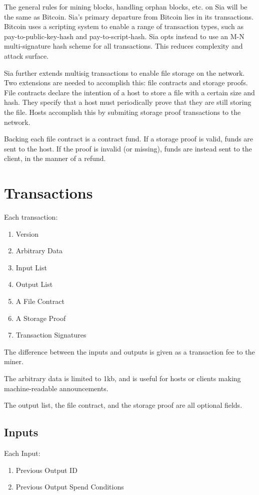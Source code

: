 \documentclass[twocolumn]{article}
\begin{document}
The general rules for mining blocks, handling orphan blocks, etc. on Sia will be the same as Bitcoin.
Sia's primary departure from Bitcoin lies in its transactions.
Bitcoin uses a scripting system to enable a range of transaction types, such as pay-to-public-key-hash and pay-to-script-hash.
Sia opts instead to use an M-N multi-signature hash scheme for all transactions.
This reduces complexity and attack surface.

Sia further extends multisig transactions to enable file storage on the network.
Two extensions are needed to accomplish this: file contracts and storage proofs.
File contracts declare the intention of a host to store a file with a certain size and hash.
They specify that a host must periodically prove that they are still storing the file.
Hosts accomplish this by submiting storage proof transactions to the network.

Backing each file contract is a contract fund.
If a storage proof is valid, funds are sent to the host.
If the proof is invalid (or missing), funds are instead sent to the client, in the manner of a refund.

\section{Transactions}
Each transaction:
\begin{enumerate}
	\item Version
	\item Arbitrary Data
	\item Input List
	\item Output List
	\item A File Contract
	\item A Storage Proof
	\item Transaction Signatures
\end{enumerate}

The difference between the inputs and outputs is given as a transaction fee to the miner.

The arbitrary data is limited to 1kb, and is useful for hosts or clients making machine-readable announcements.

The output list, the file contract, and the storage proof are all optional fields.

\subsection{Inputs}
Each Input:
\begin{enumerate}
	\item Previous Output ID
	\item Previous Output Spend Conditions
\end{enumerate}
\end{document}
